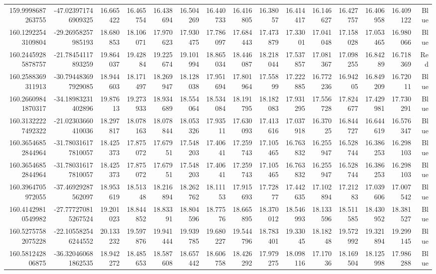 \begin{center}
\begin{longtable}{rrrrrrrrrrrrrrr}
159.9998687263755 & -47.023971746909325 & 16.665422 & 16.465754 & 16.438694 & 16.504269 & 16.440733 & 16.416805 & 16.38057 & 16.414417 & 16.146627 & 16.427757 & 16.406958 & 16.409122 & Blue \\
160.12922543109804 & -29.26958257985193 & 18.680853 & 18.106071 & 17.970623 & 17.930475 & 17.786097 & 17.684443 & 17.473879 & 17.33001 & 17.041048 & 17.158028 & 17.053465 & 16.980066 & Blue \\
160.24459285878757 & -21.78454117893259 & 19.864037 & 19.42884 & 19.225674 & 19.101994 & 18.865034 & 18.446087 & 18.218044 & 17.537857 & 17.081367 & 17.098255 & 16.84289 & 16.718369 & Red \\
160.2588369311913 & -30.794483697929085 & 18.944603 & 18.171497 & 18.269947 & 18.128038 & 17.951694 & 17.801964 & 17.55899 & 17.222885 & 16.772236 & 16.94205 & 16.849209 & 16.72011 & Blue \\
160.26609841870317 & -34.18983231402896 & 19.87613 & 19.273933 & 18.934689 & 18.554064 & 18.534084 & 18.191795 & 18.182083 & 17.931295 & 17.556728 & 17.824677 & 17.429981 & 17.730291 & Blue \\
160.31322227492322 & -21.02303660410036 & 18.297817 & 18.078163 & 18.078844 & 18.053326 & 17.93511 & 17.630093 & 17.413616 & 17.037918 & 16.37025 & 16.844727 & 16.644619 & 16.576347 & Blue \\
160.36546852844964 & -31.780316177810057 & 18.425373 & 17.875072 & 17.67951 & 17.548203 & 17.40641 & 17.259743 & 17.105465 & 16.763832 & 16.255947 & 16.528744 & 16.386253 & 16.298103 & Blue \\
160.36546852844964 & -31.780316177810057 & 18.425373 & 17.875072 & 17.67951 & 17.548203 & 17.40641 & 17.259743 & 17.105465 & 16.763832 & 16.255947 & 16.528744 & 16.386253 & 16.298103 & Blue \\
160.3964705972055 & -37.46929287562097 & 18.953619 & 18.51348 & 18.216894 & 18.262762 & 18.11153 & 17.915693 & 17.72877 & 17.442635 & 17.102894 & 17.21283 & 17.039606 & 17.007542 & Blue \\
160.41429810549982 & -27.777270815267524 & 19.201023 & 18.844852 & 18.83391 & 18.804596 & 18.77576 & 18.665895 & 18.370012 & 18.546993 & 18.133596 & 18.511585 & 18.430952 & 18.381527 & Blue \\
160.52757582075228 & -22.105582546244552 & 20.133232 & 19.597876 & 19.941444 & 19.939785 & 19.680227 & 19.544796 & 18.783401 & 19.33045 & 18.18248 & 19.572992 & 19.321894 & 19.299145 & Blue \\
160.581242806875 & -36.320460681862535 & 18.942272 & 18.485653 & 18.587608 & 18.657442 & 18.606758 & 18.426292 & 17.979275 & 18.098116 & 17.17036 & 18.169504 & 18.125998 & 17.986288 & Blue \\

\end{longtable}
\end{center}
